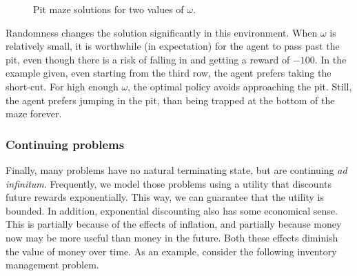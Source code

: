   \begin{figure}[H]
    \centering
    \caption{Pit maze solutions for two values of $\omega$.}
    \label{fig:pit-solution}
  \end{figure}
Randomness changes the solution significantly in this environment. When $\omega$ is relatively small, it is worthwhile (in expectation) for the agent to pass past the pit, even though there is a risk of falling in and getting a reward of $-100$. In the example given, even starting from the third row, the agent prefers taking the short-cut. For high enough $\omega$, the optimal policy avoids approaching the pit. Still, the agent prefers jumping in the pit, than being trapped at the bottom of the maze forever.


\subsubsection{Continuing problems}
Finally, many problems have no natural terminating state, but are continuing \emph{ad infinitum}. Frequently, we model those problems using a utility that discounts future rewards exponentially. This way, we can guarantee that the utility is bounded. In addition, exponential discounting also has some economical sense. This is partially because of the effects of inflation, and partially because money now may be more useful than money in the future. Both these effects diminish the value of money over time.  As an example, consider the following inventory management problem. 

